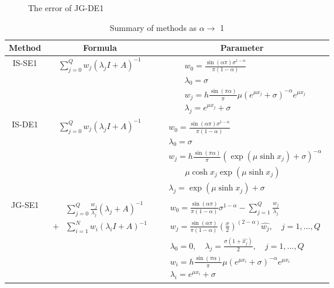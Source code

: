 \begin{figure}[htbp]
\centering
{}
~~
~~
\\
~~
~~
 \caption{The error of JG-DE1}
  \label{E_JG_DE}
\end{figure}

\begin{table}[htbp]
	\centering
	\caption{Summary of  methods as $\alpha \rightarrow$ 1 }\label{TAB_SEDE1}
	\begin{tabular}
		{c|c|c}
		\toprule
		\textbf{Method }  &  \textbf{Formula } & \textbf{Parameter}\\
		\hline
		IS-SE1&$\sum_{j=0}^{Q}w_j(\lambda_jI+A)^{-1}$&$\begin{aligned}&w_0=\frac{\sin(\alpha \pi)\sigma^{1-\alpha}}{\pi (1-\alpha)}\\& \lambda_0=\sigma\\&w_j=h \frac{\sin(\pi \alpha)}{\pi}\mu (e^{\mu x_j}+\sigma)^{-\alpha}e^{\mu x_j}\\&\lambda_j=e^{\mu x_j}+\sigma\end{aligned}$\\
		\hline
		IS-DE1 & $\sum_{j=0}^{Q}w_j(\lambda_jI+A)^{-1}$  &$\begin{aligned}&w_0=\frac{\sin(\alpha \pi)\sigma^{1-\alpha}}{\pi (1-\alpha)}\\& \lambda_0=\sigma\\&w_j=h \frac{\sin(\pi \alpha)}{\pi}(\exp(\mu \sinh x_j)+\sigma)^{-\alpha}\\&\qquad \mu\cosh x_j\exp(\mu \sinh x_j)\\&\lambda_j=\exp(\mu \sinh x_j)+\sigma\end{aligned}$\\
		\hline
		JG-SE1 & $\begin{aligned}&\sum_{j=0}^{Q}\frac{w_{j}}{\lambda_{j}}(\lambda_{j}+A)^{-1}\\+&\sum_{i=1}^{N}w_{i}(\lambda_{i}I+A)^{-1}\end{aligned}$& $ \begin{aligned}& w_0=\frac{\sin(\alpha \pi)}{\pi(1-\alpha)}\sigma^{1-\alpha}-\sum_{j=1}^{Q}\frac{w_j}{\lambda_j}\\& w_j=\frac{\sin(\alpha \pi)}{\pi(1-\alpha)}\left(\frac{\sigma}{2}\right)^{(2-\alpha)}\hat{w_j},\quad j=1,...,Q\\& \lambda_0=0,\quad \lambda_j=\frac{\sigma(1+\hat{x_j})}{2},\quad j=1,...,Q \\&w_i=h \frac{\sin(\pi \alpha)}{\pi}\mu (e^{\mu x_i}+\sigma)^{-\alpha}e^{\mu x_i}\\&\lambda_i=e^{\mu x_i}+\sigma\end{aligned}$ \\

\end{tabular}
\end{table}
